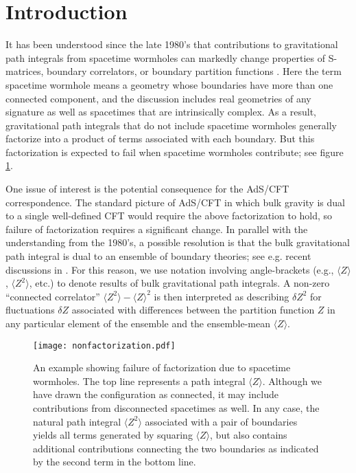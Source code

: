 \documentclass[11pt]{article}
\begin{document}
\setcounter{tocdepth}{3}
{\hypersetup{linkcolor=black}\tableofcontents}

\section{Introduction}\label{sec:intro}

It has been understood since the late 1980's that contributions to gravitational path integrals from spacetime wormholes can markedly change properties of S-matrices, boundary correlators, or boundary partition functions \cite{Lavrelashvili:1987jg,Hawking:1987mz,Hawking:1988ae,Coleman:1988cy,Giddings:1988cx,Giddings:1988wv}.  
Here the term spacetime wormhole means a geometry whose boundaries have more than one connected component, and the discussion includes real geometries of any signature as well as spacetimes that are intrinsically complex. 
As a result, gravitational path integrals that do not include spacetime wormholes generally factorize into a product of terms associated with each boundary.   
But this factorization is expected to fail when spacetime wormholes contribute; see figure \ref{fig:nofac}.

One issue of interest is the potential consequence for the AdS/CFT correspondence.  
The standard picture of AdS/CFT in which bulk gravity is dual to a single well-defined CFT \cite{Maldacena:1997re,Gubser:1998bc,Witten:1998qj} would require the above factorization to hold, so failure of factorization requires a significant change.
In parallel with the understanding from the 1980's, a possible resolution is that the bulk gravitational path integral is dual to an ensemble of boundary theories; see e.g. recent discussions in
\cite{SSS-1,Saad:2019lba,Stanford:2019vob,Marolf:2020xie,Betzios:2020nry,Cotler:2020ugk,Maxfield:2020ale,Afkhami-Jeddi:2020ezh,Maloney:2020nni,Garcia-Garcia:2020ttf}.
For this reason, we use notation involving angle-brackets (e.g., $\langle Z \rangle$, $\langle Z^2 \rangle$, etc.) to denote results of bulk gravitational path integrals.   
A non-zero ``connected correlator'' $\langle Z^2 \rangle - \langle Z \rangle^2$ is then interpreted as describing $\delta Z^2$ for fluctuations $\delta Z$ associated with differences between the partition function $Z$ in any particular element of the ensemble and the ensemble-mean $\langle Z \rangle$.


\begin{figure}[h]
\centering
\texttt{[image: nonfactorization.pdf]}\\
\caption{An example showing failure  of factorization due to spacetime wormholes. The top line represents a path integral $\langle Z\rangle$. Although we have drawn the configuration as connected, it may include contributions from disconnected spacetimes as well. In any case, the natural path integral $\langle Z^2 \rangle$ associated with a pair of boundaries yields all terms generated by squaring $\langle Z\rangle$, but also contains additional contributions connecting the two boundaries as indicated by the second term in the bottom line.}
\label{fig:nofac}
\end{figure}
\end{document}
